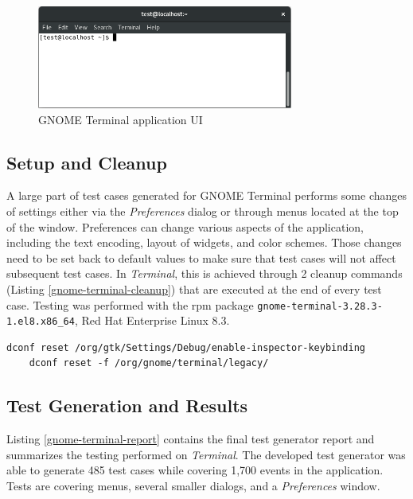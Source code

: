 
\begin{figure}[H]
	\centering
	\includegraphics[width=0.75\textwidth,clip]{obrazky-figures/gnome-terminal-ui.png}
	\caption{GNOME Terminal application UI}
	\label{terminal-gui}
\end{figure}

\subsection{Setup and Cleanup}
A large part of test cases generated for GNOME Terminal performs some changes of settings either via the \textit{Preferences} dialog or through menus located at the top of the window. Preferences can change various aspects of the application, including the text encoding, layout of widgets, and color schemes. Those changes need to be set back to default values to make sure that test cases will not affect subsequent test cases. In \textit{Terminal}, this is achieved through 2 cleanup commands (Listing \ref{gnome-terminal-cleanup}) that are executed at the end of every test case. Testing was performed with the rpm package \texttt{gnome-terminal-3.28.3-1.el8.x86\_64}, Red Hat Enterprise Linux 8.3.

\begin{lstlisting}[caption={The cleanup commands required to reset GNOME Terminal to the default settings},label={gnome-terminal-cleanup}]
    dconf reset /org/gtk/Settings/Debug/enable-inspector-keybinding
    dconf reset -f /org/gnome/terminal/legacy/
\end{lstlisting}

\subsection{Test Generation and Results}
Listing \ref{gnome-terminal-report} contains the final test generator report and summarizes the testing performed on \textit{Terminal}. The developed test generator was able to generate 485 test cases while covering 1,700 events in the application. Tests are covering menus, several smaller dialogs, and a \textit{Preferences} window.

